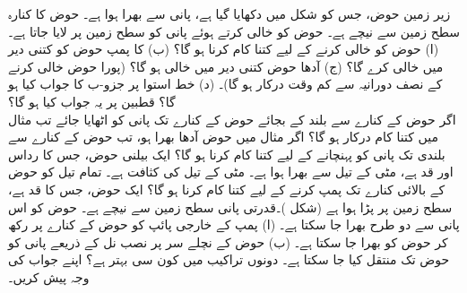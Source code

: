  زیر زمین حوض،  جس کو شکل  میں دکھایا گیا ہے، پانی سے بھرا ہوا ہے۔ حوض کا کنارہ سطح زمین سے  نیچے ہے۔ حوض کو خالی کرتے ہوئے  پانی کو سطح زمین پر لایا جاتا ہے۔(ا) حوض کو خالی کرنے کے لیے کتنا کام کرنا ہو گا؟ (ب)   کا پمپ حوض کو کتنی دیر میں خالی کرے گا؟ (ج) آدھا حوض کتنی دیر میں خالی ہو گا؟ (پورا حوض خالی کرنے کے نصف دورانیہ سے کم وقت درکار ہو گا)۔ (د) خط استوا پر جزو-ب کا جواب کیا ہو گا؟ قطبین پر یہ جواب کیا ہو گا؟\\
اگر حوض کے کنارے سے  بلند کے بجائے حوض کے کنارے تک پانی کو اٹھایا جائے تب مثال  میں کتنا کام درکار ہو گا؟
اگر مثال  میں حوض آدھا بھرا ہو، تب حوض کے کنارے سے  بلندی تک پانی کو پہنچانے کے لیے کتنا کام کرنا ہو گا؟
ایک بیلنی حوض،  جس کا رداس  اور قد  ہے، مٹی کے تیل سے بھرا ہوا ہے۔ مٹی کے تیل کی کثافت  ہے۔ تمام تیل کو حوض کے بالائی کنارے تک پمپ  کرنے کے لیے کتنا کام کرنا ہو گا؟
ایک حوض،  جس کا قد   ہے، سطح زمین پر پڑا ہوا ہے (شکل )۔قدرتی پانی  سطح زمین سے  نیچے ہے۔ حوض کو اس پانی سے دو طرح بھرا جا سکتا ہے۔ (ا) پمپ کے خارجی پائپ کو حوض کے کنارے پر رکھ کر حوض کو بھرا جا سکتا ہے۔ (ب) حوض کے نچلے  سر پر   نصب  نل کے ذریعے  پانی کو حوض تک منتقل کیا جا سکتا ہے۔ دونوں تراکیب میں کون سی  بہتر ہے؟ اپنے جواب کی وجہ پیش کریں۔     
